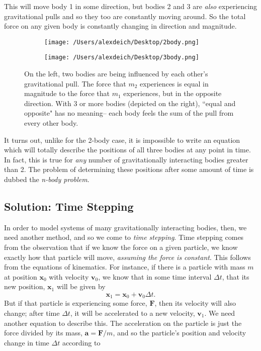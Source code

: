 \documentclass[11pt]{article}
\begin{document}
This will move body 1 in some direction, but bodies 2 and 3 are \emph{also} experiencing gravitational pulls and so they too are constantly moving around. So the total force on any given body is constantly changing in direction and magnitude.

\begin{figure}[ht]
\centering
\begin{subfigure}[t]{.5\textwidth}
  \centering
\texttt{[image: /Users/alexdeich/Desktop/2body.png]}
  \label{fig:2body}
\end{subfigure}%
\hfill
\begin{subfigure}[t]{.5\textwidth}
  \centering
  \texttt{[image: /Users/alexdeich/Desktop/3body.png]}
  \label{fig:3body}
\end{subfigure}
\caption{On the left, two bodies are being influenced by each other's gravitational pull.  The force that $m_2$ experiences is equal in magnitude to the force that $m_1$ experiences, but in the opposite direction.  With 3 or more bodies (depicted on the right), ``equal and opposite" has no meaning\--- each body feels the sum of the pull from every other body.}
\end{figure}

It turns out, unlike for the 2-body case, it is impossible to write an equation which will totally describe the positions of all three bodies at any point in time.  In fact, this is true for \emph{any} number of gravitationally interacting bodies greater than 2.  The problem of determining these positions after some amount of time is dubbed the \emph{n-body problem}.

\subsection{Solution: Time Stepping}
In order to model systems of many gravitationally interacting bodies, then, we need another method, and so we come to \emph{time stepping}.  Time stepping comes from the observation that if we know the force on a given particle, we know exactly how that particle will move, \emph{assuming the force is constant}.  This follows from the equations of kinematics.  For instance, if there is a particle with mass $m$ at position $\mathbf{x}_0$ with velocity $\mathbf{v}_0$, we know that in some time interval $\Delta t$, that its new position, $\mathbf{x}_1$ will be given by
\begin{equation*}
\mathbf{x}_1=\mathbf{x}_0 + \mathbf{v}_0 \Delta t.
\end{equation*}
But if that particle is experiencing some force, $\mathbf{F}$, then its velocity will also change; after time $\Delta t$, it will be accelerated to a new velocity, $\mathbf{v}_1$.  We need another equation to describe this.  The acceleration on the particle is just the force divided by its mass, $\mathbf{a} = \mathbf{F}/m$, and so the particle's position and velocity change in time $\Delta t$ according to
\end{document}

